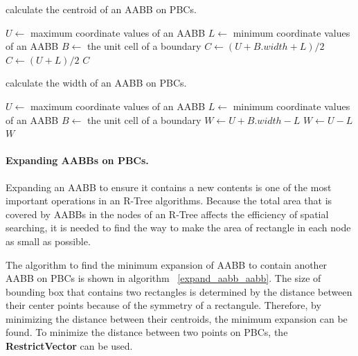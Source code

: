 \documentclass[10pt,letterpaper,twocolumn]{article}
\begin{document}
\begin{algorithm}[thb]
    \caption{calculate the centroid of an AABB on PBCs.}
    \label{center_aabb}
    \begin{algorithmic}
        \State $U \gets$ maximum coordinate values of an AABB
        \State $L \gets$ minimum coordinate values of an AABB
        \State $B \gets$ the unit cell of a boundary
                \State $C \gets (U + B.width + L) / 2$
            \Else
                \State $C \gets (U + L) / 2$
            \EndIf
            \State \Return $C$
        \EndFunction
     \end{algorithmic}
\end{algorithm}

\begin{algorithm}[thb]
    \caption{calculate the width of an AABB on PBCs.}
    \label{radius_aabb}
    \begin{algorithmic}
        \State $U \gets$ maximum coordinate values of an AABB
        \State $L \gets$ minimum coordinate values of an AABB
        \State $B \gets$ the unit cell of a boundary
                \State $W \gets U + B.width - L$
            \Else
                \State $W \gets U - L$
            \EndIf
            \State \Return $W$
        \EndFunction
     \end{algorithmic}
\end{algorithm}

\paragraph{Expanding AABBs on PBCs.}
Expanding an AABB to ensure it contains a new contents is one of the most
important operations in an R-Tree algorithms.
Because the total area that is covered by AABBs in the nodes of an R-Tree
affects the efficiency of spatial searching, it is needed to find the way to
make the area of rectangle in each node as small as possible.

The algorithm to find the minimum expansion of AABB to contain another AABB on
PBCs is shown in algorithm ~\ref{expand_aabb_aabb}.
The size of bounding box that contains two rectangles is determined by the
distance between their center points because of the symmetry of a rectangule.
Therefore, by minimizing the distance between their centroids, the minimum
expansion can be found. To minimize the distance between two points on PBCs,
the \textbf{RestrictVector} can be used.
\end{document}
